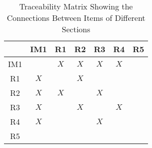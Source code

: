\documentclass[12pt]{article}
\newcommand{\dref}[1]{GD\ref{#1}}
\newcommand{\ddref}[1]{DD\ref{#1}}
\newcommand{\tref}[1]{TM\ref{#1}}
\newcommand{\iref}[1]{IM\ref{#1}}
\begin{document}
\begin{table}[h!]
\centering%
\begin{tabular}{|c|c|c|c|c|c|c|}
\hline & IM1 & R1 & R2 & R3 & R4 & R5 \\
\hline IM1 & & $X$ & $X$ & $X$ & $X$ & \\
\hline R1 & $X$ & & $X$ & & & \\
\hline R2 & $X$ & $X$ & & $X$ & & \\
\hline R3 & $X$ & & $X$ & & $X$ & \\
\hline R4 & $X$ & & & $X$ & & \\
\hline R5 & & & & & & \\
\hline
\end{tabular}
\caption{Traceability Matrix Showing the Connections Between Items of Different Sections}
\label{Table:trace}
\end{table}
\end{document}
